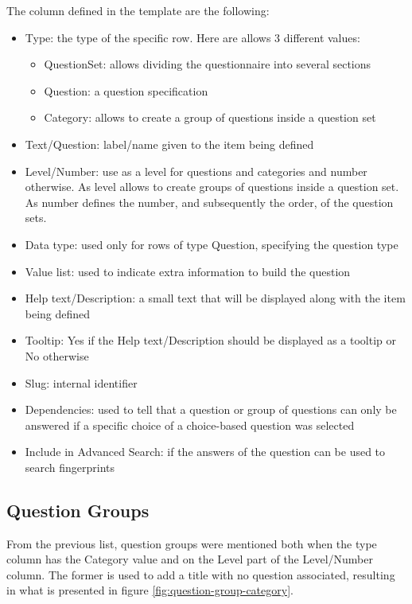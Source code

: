 The column defined in the template are the following:
\begin{itemize}
    \item Type: the type of the specific row. Here are allows 3 different values:
        \begin{itemize}
            \item QuestionSet: allows dividing the questionnaire into several sections
            \item Question: a question specification
            \item Category: allows to create a group of questions inside a question set
        \end{itemize}
    \item Text/Question: label/name given to the item being defined
    \item Level/Number: use as a level for questions and categories and number otherwise. As level allows to create groups of questions inside a question set. As number defines the number, and subsequently the order, of the question sets.
    \item Data type: used only for rows of type Question, specifying the question type
    \item Value list: used to indicate extra information to build the question
    \item Help text/Description: a small text that will be displayed along with the item being defined
    \item Tooltip: Yes if the Help text/Description should be displayed as a tooltip or No otherwise
    \item Slug: internal identifier
    \item Dependencies: used to tell that a question or group of questions can only be answered if a specific choice of a choice-based question was selected
    \item Include in Advanced Search: if the answers of the question can be used to search fingerprints
\end{itemize}

\subsection*{Question Groups}
From the previous list, question groups were mentioned both when the type column has the Category value and on the Level part of the Level/Number column.
The former is used to add a title with no question associated, resulting in what is presented in figure \ref{fig:question-group-category}.

